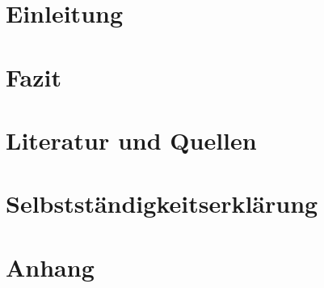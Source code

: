 \documentclass[12pt]{article}
\author{Christoph Derszteler}
\begin{document}
  
  \newpage

  \tableofcontents
  \newpage

  \section{Einleitung}\label{sec:introduction}
  \newpage

  

  \section{Fazit}\label{sec:conclusion}
  \newpage

  \section{Literatur und Quellen}\label{sec:literature-and-sources}
  \printbibliography[heading=none]
  \newpage

  \section{Selbstständigkeitserklärung}\label{sec:declration-of-independence}
  \newpage

  \section{Anhang}\label{sec:appendix}
  \newpage
\end{document}
